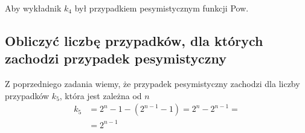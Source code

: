 \documentclass[a4paper,12pt]{article}
\begin{document}
Aby wykładnik $k_4$ był przypadkiem pesymistycznym funkcji Pow.

\subsection{Obliczyć liczbę przypadków, dla których zachodzi przypadek pesymistyczny}

Z poprzedniego zadania wiemy, że przypadek pesymistyczny zachodzi dla liczby przypadków $k_5$,
która jest zależna od $n$
\begin{align*}
		k_5 &= 2^n - 1 - \left( 2^{n-1} - 1 \right) = 2^n - 2^{n- 1} = \\
		&= 2^{n-1}
\end{align*}
\end{document}
